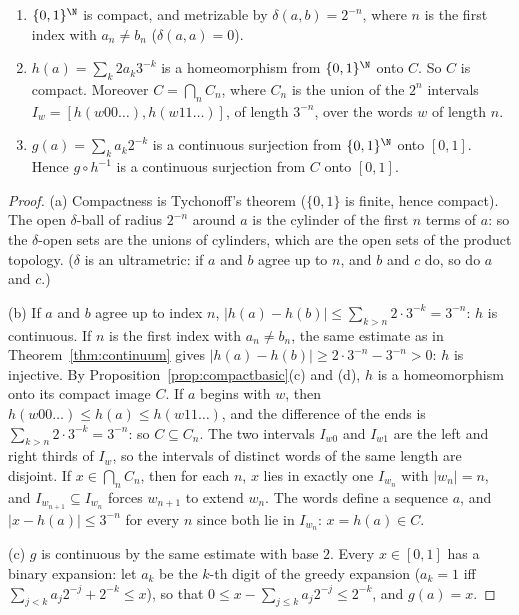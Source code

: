 \begin{proposition}\label{prop:cantor}
\begin{enumerate}[label=(\alph*)]
\item $\{0,1\}^\N$ is compact, and metrizable by $\delta(a,b)=2^{-n}$, where $n$ is the first index with $a_n\ne b_n$ ($\delta(a,a)=0$).
\item $h(a)=\sum_k2a_k3^{-k}$ is a homeomorphism from $\{0,1\}^\N$ onto $C$. So $C$ is compact. Moreover $C=\bigcap_nC_n$, where $C_n$ is the union of the $2^n$ intervals
$I_w=[h(w00\ldots),h(w11\ldots)]$, of length $3^{-n}$, over the words $w$ of length $n$.
\item $g(a)=\sum_ka_k2^{-k}$ is a continuous surjection from $\{0,1\}^\N$ onto $[0,1]$. Hence $g\circ h^{-1}$ is a continuous surjection from $C$ onto $[0,1]$.
\end{enumerate}
\end{proposition}
\begin{proof}
(a) Compactness is Tychonoff's theorem ($\{0,1\}$ is finite, hence compact). The open $\delta$-ball of radius $2^{-n}$ around $a$ is the cylinder of the first $n$ terms of $a$:
so the $\delta$-open sets are the unions of cylinders, which are the open sets of the product topology. ($\delta$ is an ultrametric: if $a$ and $b$ agree up to
$n$, and $b$ and $c$ do, so do $a$ and $c$.)

(b) If $a$ and $b$ agree up to index $n$, $|h(a)-h(b)|\le\sum_{k>n}2\cdot3^{-k}=3^{-n}$: $h$ is continuous. If $n$ is the first index with $a_n\ne b_n$, the same estimate as in
Theorem~\ref{thm:continuum} gives $|h(a)-h(b)|\ge2\cdot3^{-n}-3^{-n}>0$: $h$ is injective. By Proposition~\ref{prop:compactbasic}(c) and (d), $h$ is a homeomorphism onto its
compact image $C$. If $a$ begins with $w$, then $h(w00\ldots)\le h(a)\le h(w11\ldots)$, and the difference of the ends is $\sum_{k>n}2\cdot3^{-k}=3^{-n}$: so $C\subseteq C_n$. The two
intervals $I_{w0}$ and $I_{w1}$ are the left and right thirds of $I_w$, so the intervals of distinct words of the same length are disjoint. If $x\in\bigcap_nC_n$, then
for each $n$, $x$ lies in exactly one $I_{w_n}$ with $|w_n|=n$, and $I_{w_{n+1}}\subseteq I_{w_n}$ forces $w_{n+1}$ to extend $w_n$. The words define a sequence $a$, and
$|x-h(a)|\le3^{-n}$ for every $n$ since both lie in $I_{w_n}$: $x=h(a)\in C$.

(c) $g$ is continuous by the same estimate with base $2$. Every $x\in[0,1]$ has a binary expansion: let $a_k$ be the $k$-th digit of the greedy expansion
($a_k=1$ iff $\sum_{j<k}a_j2^{-j}+2^{-k}\le x$), so that $0\le x-\sum_{j\le k}a_j2^{-j}\le2^{-k}$, and $g(a)=x$.
\end{proof}

